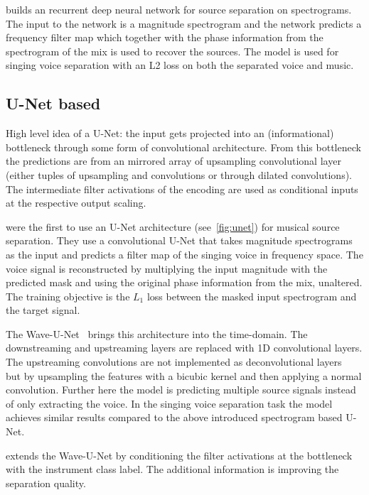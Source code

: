 \textcite{huangSingingVoice2014} builds an recurrent deep neural network for source separation on spectrograms. The input to the network is a magnitude spectrogram and the network predicts a frequency filter map which together with the phase information from the spectrogram of the mix is used to recover the sources. The model is used for singing voice separation with an L2 loss on both the separated voice and music.

\subsection{U-Net based}
\begin{marginfigure}
    \caption{High level idea of a U-Net: the input gets projected into an (informational) bottleneck through some form of convolutional architecture. From this bottleneck the predictions are from an mirrored array of upsampling convolutional layer (either tuples of upsampling and convolutions or through dilated convolutions). The intermediate filter activations of the encoding are used as conditional inputs at the respective output scaling.}%
    \label{fig:unet}
\end{marginfigure}
\textcite{janssonSinging2017} were the first to use an U-Net architecture (see~\cref{fig:unet}) for musical source separation. They use a convolutional U-Net that takes magnitude spectrograms as the input and predicts a filter map of the singing voice in frequency space. The voice signal is reconstructed by multiplying the input magnitude with the predicted mask and using the original phase information from the mix, unaltered. The training objective is the \(L_1\) loss between the masked input spectrogram and the target signal.

The Wave-U-Net~\cite{stollerWaveUNet2018} brings this architecture into the time-domain. The downstreaming and upstreaming layers are replaced with 1D convolutional layers. The upstreaming convolutions are not implemented as deconvolutional layers~\cite{dumoulinGuide2018} but by upsampling the features with a bicubic kernel and then applying a normal convolution. Further here the model is predicting multiple source signals instead of only extracting the voice. In the singing voice separation task the model achieves similar results compared to the above introduced spectrogram based U-Net.

\textcite{slizovskaiaEndtoEnd2019} extends the Wave-U-Net by conditioning the filter activations at the bottleneck with the instrument class label. The additional information is improving the separation quality.

